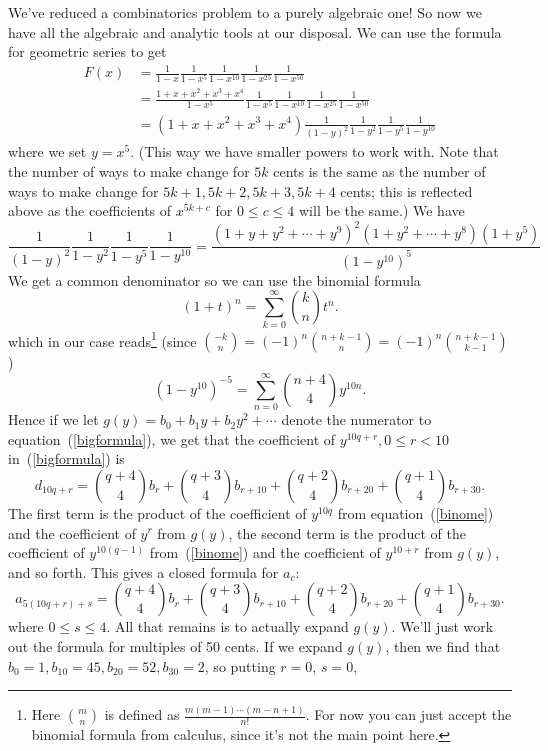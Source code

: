 \documentclass[12pt,twoside]{article}
\theoremstyle{norm}
\newcommand{\rc}[1]{\frac{1}{#1}}
\begin{document}
We've reduced a combinatorics problem to a purely algebraic one! So now we have all the algebraic and analytic tools at our disposal. We can use the formula for geometric series to get
\begin{align*}
F(x)&=\rc{1-x}\rc{1-x^5}\rc{1-x^{10}}\rc{1-x^{25}}\rc{1-x^{50}}\\
&=\frac{1+x+x^2+x^3+x^4}{1-x^5}\rc{1-x^5}\rc{1-x^{10}}\rc{1-x^{25}}\rc{1-x^{50}}\\
&=(1+x+x^2+x^3+x^4)\rc{(1-y)^2}\rc{1-y^2}\rc{1-y^5}\rc{1-y^{10}}
\end{align*}
where we set $y=x^5$. (This way we have smaller powers to work with. Note that the number of ways to make change for $5k$ cents is the same as the number of ways to make change for $5k+1,5k+2,5k+3,5k+4$ cents; this is reflected above as the coefficients of $x^{5k+c}$ for $0\leq c\leq 4$ will be the same.) We have
\begin{equation}\label{bigformula}
\rc{(1-y)^2}\rc{1-y^2}\rc{1-y^5}\rc{1-y^{10}}
=\frac{(1+y+y^2+\cdots +y^9)^2(1+y^2+\cdots +y^8)(1+y^5)}{(1-y^{10})^5}
\end{equation}
We get a common denominator so we can use the binomial formula
\[
(1+t)^n=\sum_{k=0}^{\infty} \binom{k}{n}t^n.
\]
which in our case reads\footnote{Here $\binom{m}{n}$ is defined as $\frac{m(m-1)\cdots (m-n+1)}{n!}$. For now you can just accept the binomial formula from calculus, since it's not the main point here.} (since $\binom{-k}{n}=(-1)^n\binom{n+k-1}{n}=(-1)^n\binom{n+k-1}{k-1}$)
\begin{equation}\label{binome}
(1-y^{10})^{-5}=\sum_{n=0}^{\infty} \binom{n+4}{4}y^{10n}.
\end{equation}
Hence if we let $g(y)=b_0+b_1y+b_2y^2+\cdots $ denote the numerator to equation~(\ref{bigformula}), we get that the coefficient of $y^{10q+r}, 0\leq r<10$ in~(\ref{bigformula}) is
\[
d_{10q+r}=
\binom{q+4}{4}b_r + \binom{q+3}{4}b_{r+10} + \binom{q+2}{4}b_{r+20} + \binom{q+1}{4}b_{r+30}.
\]
The first term is the product of the coefficient of $y^{10q}$ from equation~(\ref{binome}) and the coefficient of $y^r$ from $g(y)$, the second term is the product of the coefficient of $y^{10(q-1)}$ from~(\ref{binome}) and the coefficient of $y^{10+r}$ from $g(y)$, and so forth. This gives a closed formula for $a_c$:
\begin{equation}\label{coinfinal}
a_{5(10q+r)+s} = \binom{q+4}{4}b_r + \binom{q+3}{4}b_{r+10} + \binom{q+2}{4}b_{r+20} + \binom{q+1}{4}b_{r+30}.
\end{equation}
where $0\leq s\leq 4$. 
All that remains is to actually expand $g(y)$. We'll just work out the formula for multiples of 50 cents. If we expand $g(y)$, then we find that $b_0=1, b_{10}=45,b_{20}=52, b_{30}=2$, so putting $r=0$, $s=0$,
\end{document}
